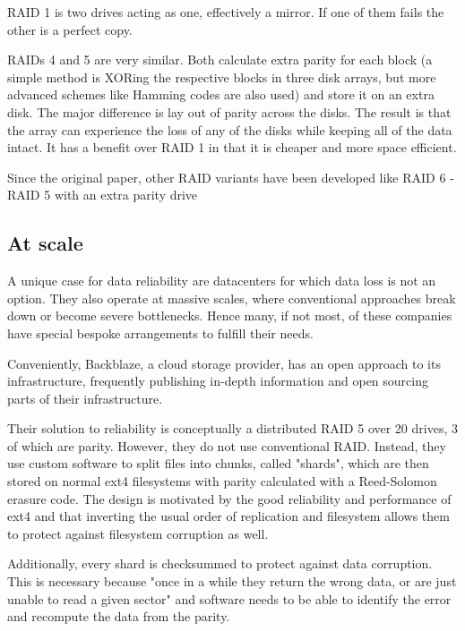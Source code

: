             RAID 1 is two drives acting as one, effectively a mirror. If one of
            them fails the other is a perfect copy.

            RAIDs 4 and 5 are very similar. Both calculate extra parity for
            each block (a simple method is XORing the respective blocks in
            three disk arrays, but more advanced schemes like Hamming codes are
            also used) and store it on an extra disk. The major difference is
            lay out of parity across the disks. The result is that the array
            can experience the loss of any of the disks while keeping all of
            the data intact. It has a benefit over RAID 1 in that it is
            cheaper and more space efficient.

            Since the original paper, other RAID variants have been developed
            like RAID 6 \cite{RAID6} - RAID 5 with an extra parity drive

        \subsection{At scale}

            A unique case for data reliability are datacenters for which data
            loss is not an option. They also operate at massive scales, where
            conventional approaches break down or become severe bottlenecks.
            Hence many, if not most, of these companies have special bespoke
            arrangements to fulfill their needs.

            Conveniently, Backblaze, a cloud storage provider, has an open
            approach to its infrastructure, frequently publishing in-depth
            information and open sourcing parts of their infrastructure.

            Their solution to reliability \cite{Backblaze_arch} is conceptually
            a distributed RAID 5 over 20 drives, 3 of which are parity.
            However, they do not use conventional RAID.  Instead, they use
            custom software to split files into chunks, called "shards", which
            are then stored on normal ext4 filesystems with parity calculated
            with a Reed-Solomon erasure code. The design is motivated by the
            good reliability and performance of ext4 and that inverting the
            usual order of replication and filesystem allows them to protect
            against filesystem corruption as well.

            Additionally, every shard is checksummed to protect against data
            corruption. This is necessary because "once in a while they return
            the wrong data, or are just unable to read a given sector"
            \cite{Backblaze_arch} and software needs to be able to identify the
            error and recompute the data from the parity.

